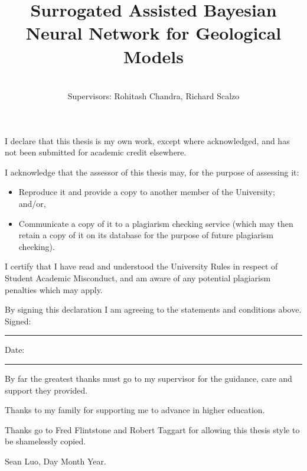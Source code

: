 \documentclass[honours,12pt]{unswthesis}
\title{Surrogated Assisted Bayesian Neural Network for Geological Models}
\author{\Authornameonly\\{\bigskip}Supervisors: Rohitash Chandra, Richard Scalzo}
\newcommand\blankpage{%
    \null
    \thispagestyle{empty}%
    \addtocounter{page}{-1}%
    \newpage}
\numberwithin{equation}{section}
\begin{document}
\beforepreface

\afterpage{\blankpage}



\vskip 10pc \noindent I declare that this thesis is my
own work, except where acknowledged, and has not been submitted for
academic credit elsewhere. 

\vskip 2pc  \noindent I acknowledge that the assessor of this
thesis may, for the purpose of assessing it:
\begin{itemize}
\item Reproduce it and provide a copy to another member of the University; and/or,
\item Communicate a copy of it to a plagiarism checking service (which may then retain a copy of it on its database for the purpose of future plagiarism checking).
\end{itemize}

\vskip 2pc \noindent I certify that I have read and understood the University Rules in
respect of Student Academic Misconduct, and am aware of any potential plagiarism penalties which may 
apply.\vspace{24pt}

\vskip 2pc \noindent By signing 
this declaration I am
agreeing to the statements and conditions above.
\vskip 2pc \noindent
Signed: \rule{7cm}{0.25pt} \hfill Date: \rule{4cm}{0.25pt} \newline
\vskip 1pc

\afterpage{\blankpage}




{\bigskip}By far the greatest thanks must go to my supervisor for
the guidance, care and support they provided. 
 
{\bigskip} Thanks to my family for supporting me to advance in higher education.

{\bigskip\noindent} Thanks go to Fred Flintstone and Robert Taggart for allowing this thesis
style to be shamelessly copied.

{\bigskip\bigskip\bigskip\noindent} Sean Luo, Day Month Year.

\afterpage{\blankpage}


\end{document}
